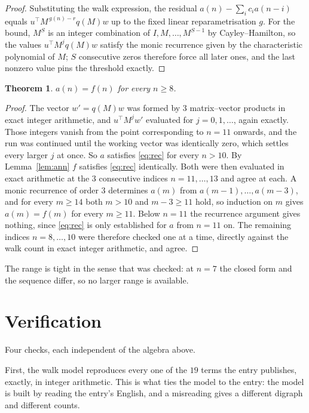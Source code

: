 \documentclass[11pt,a4paper]{article}
\theoremstyle{plain}
\newtheorem{theorem}{Theorem}
\theoremstyle{definition}
\begin{document}
\begin{proof}
Substituting the walk expression, the residual $a(n)-\sum_ic_ia(n-i)$ equals
$u^{\!\top}M^{\,g(n)-r}q(M)w$ up to the fixed linear reparametrisation $g$. For the bound,
$M^{S}$ is an integer combination of $I,M,\dots,M^{S-1}$ by Cayley--Hamilton, so the values
$u^{\!\top}M^{j}q(M)w$ satisfy the monic recurrence given by the characteristic polynomial of
$M$; $S$ consecutive zeros therefore force all later ones, and the last nonzero value pins the
threshold exactly.
\end{proof}

\begin{theorem}
$a(n)=f(n)$ for every $n\ge8$.
\end{theorem}

\begin{proof}
The vector $w'=q(M)w$ was formed by $3$ matrix--vector products in exact integer
arithmetic, and $u^{\!\top}M^{j}w'$ evaluated for $j=0,1,\dots$, again exactly. Those integers
vanish from the point corresponding to $n=11$ onwards, and the run was continued until the
working vector was identically zero, which settles every larger $j$ at once. So $a$ satisfies
\eqref{eq:rec} for every $n>10$. By Lemma~\ref{lem:ann} $f$ satisfies \eqref{eq:rec}
identically. Both were then evaluated in exact arithmetic at the $3$ consecutive indices
$n=11,\dots,13$ and agree at each. A monic recurrence of order $3$
determines $a(m)$ from $a(m-1),\dots,a(m-3)$, and for every $m\ge14$ both
$m>10$ and $m-3\ge11$ hold, so induction on $m$ gives $a(m)=f(m)$ for every
$m\ge11$.
Below $n=11$ the recurrence argument gives nothing, since \eqref{eq:rec} is only
established for $a$ from $n=11$ on. The remaining indices $n=8,\dots,10$ were
therefore checked one at a time, directly against the walk count in exact integer arithmetic,
and agree.
\end{proof}

The range is tight in the sense that was checked: at $n=7$ the closed form and the sequence differ, so no larger range is available.

\section{Verification}

Four checks, each independent of the algebra above.

First, the walk model reproduces every one of the $19$ terms the entry publishes,
exactly, in integer arithmetic. This is what ties the model to the entry: the model is built
by reading the entry's English, and a misreading gives a different digraph and different
counts.
\end{document}
